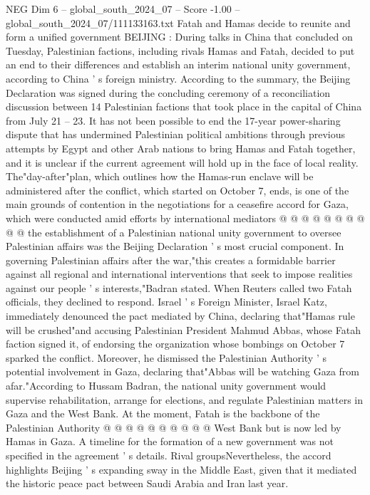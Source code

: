 \begin{textsample}{NEG Dim 6 – global\_south\_2024\_07 – Score -1.00 – global\_south\_2024\_07/111133163.txt}  \label{ex:f6_neg_119}
Fatah and Hamas decide to reunite and form a unified government BEIJING : During talks in China that concluded on Tuesday, Palestinian factions, including rivals Hamas and Fatah, decided to put an end to their differences and establish an interim national unity government, according to China ' s foreign ministry.
According to the summary, the Beijing Declaration was signed during the concluding ceremony of a reconciliation discussion between 14 Palestinian factions that took place in the capital of China from July 21 -- 23.
It has not been possible to end the 17-year power-sharing dispute that has undermined Palestinian political ambitions through previous attempts by Egypt and other Arab nations to bring Hamas and Fatah together, and it is unclear if the current agreement will hold up in the face of local reality.
The"day-after"plan, which outlines how the Hamas-run enclave will be administered after the conflict, which started on October 7, ends, is one of the main grounds of contention in the negotiations for a ceasefire accord for Gaza, which were conducted amid efforts by international mediators @ @ @ @ @ @ @ @ @ @ the establishment of a Palestinian national unity government to oversee Palestinian affairs was the Beijing Declaration ' s most crucial component.
In governing Palestinian affairs after the war,"this creates a formidable barrier against all regional and international interventions that seek to impose realities against our people ' s interests,"Badran stated.
When Reuters called two Fatah officials, they declined to respond.
Israel ' s Foreign Minister, Israel Katz, immediately denounced the pact mediated by China, declaring that"Hamas rule will be crushed"and accusing Palestinian President Mahmud Abbas, whose Fatah faction signed it, of endorsing the organization whose bombings on October 7 sparked the conflict.
Moreover, he dismissed the Palestinian Authority ' s potential involvement in Gaza, declaring that"Abbas will be watching Gaza from afar."According to Hussam Badran, the national unity government would supervise rehabilitation, arrange for elections, and regulate Palestinian matters in Gaza and the West Bank.
At the moment, Fatah is the backbone of the Palestinian Authority @ @ @ @ @ @ @ @ @ @ West Bank but is now led by Hamas in Gaza.
A timeline for the formation of a new government was not specified in the agreement ' s details.
Rival groupsNevertheless, the accord highlights Beijing ' s expanding sway in the Middle East, given that it mediated the historic peace pact between Saudi Arabia and Iran last year.

\end{textsample}
